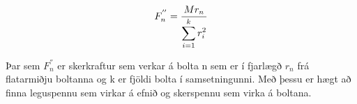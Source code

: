 \begin{equation}
	F_n^{''} = {M r_n \over \displaystyle\sum_{i=1}^{k} r_i^2}
	\label{eq::2}
\end{equation}

Þar sem $F_n^{''}$ er skerkraftur sem verkar á bolta n sem er í fjarlægð $r_n$ frá flatarmiðju boltanna og k er fjöldi bolta í samsetningunni. Með þessu er hægt að finna leguspennu sem virkar á efnið og skerspennu sem virka á boltana.